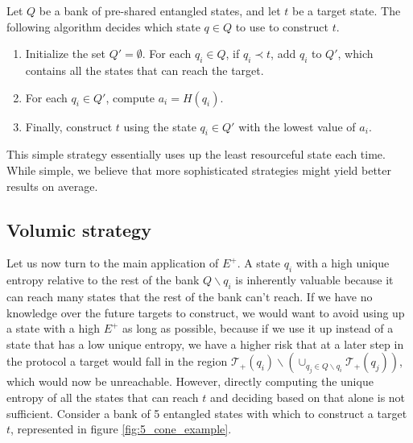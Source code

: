 \begin{definition}
    Let $Q$ be a bank of pre-shared entangled states, and let $t$ be a target state. The following algorithm decides which state $q \in Q$ to use to construct $t$.
    \begin{enumerate}
        \item Initialize the set $Q' = \emptyset$. For each $q_i \in Q$, if $q_i \prec t$, add $q_i$ to $Q'$, which contains all the states that can reach the target.
        \item For each $q_i \in Q'$, compute $a_i = H(q_i)$.
        \item Finally, construct $t$ using the state $q_i \in Q'$ with the lowest value of $a_i$.
    \end{enumerate}
\end{definition}

This simple strategy essentially uses up the least resourceful state each time. While simple, we believe that more sophisticated strategies might yield better results on average.



\subsection{Volumic strategy}

Let us now turn to the main application of $E^+$. A state $q_i$ with a high unique entropy relative to the rest of the bank $Q \backslash q_i$ is inherently valuable because it can reach many states that the rest of the bank can't reach. If we have no knowledge over the future targets to construct, we would want to avoid using up a state with a high $E^+$ as long as possible, because if we use it up instead of a state that has a low unique entropy, we have a higher risk that at a later step in the protocol a target would fall in the region
$\mathcal{T}_+(q_i) \backslash \left(\cup_{q_j \in Q \backslash q_i} \mathcal{T}_+(q_j)\right)$, which would now be unreachable. However, directly computing the unique entropy of all the states that can reach $t$ and deciding based on that alone is not sufficient. Consider a bank of 5 entangled states with which to construct a target $t$, represented in figure \ref{fig:5_cone_example}.

